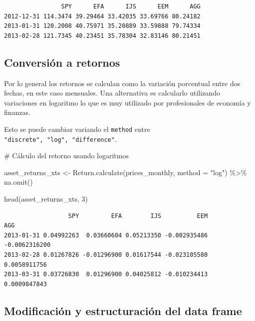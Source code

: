 \documentclass[
  letterpaper,
  DIV=11,
  numbers=noendperiod]{scrartcl}
\newenvironment{Shaded}{\begin{snugshade}}{\end{snugshade}}
\newcommand{\AttributeTok}[1]{\textcolor[rgb]{0.40,0.45,0.13}{#1}}
\newcommand{\CommentTok}[1]{\textcolor[rgb]{0.37,0.37,0.37}{#1}}
\newcommand{\DecValTok}[1]{\textcolor[rgb]{0.68,0.00,0.00}{#1}}
\newcommand{\FunctionTok}[1]{\textcolor[rgb]{0.28,0.35,0.67}{#1}}
\newcommand{\NormalTok}[1]{\textcolor[rgb]{0.00,0.23,0.31}{#1}}
\newcommand{\OtherTok}[1]{\textcolor[rgb]{0.00,0.23,0.31}{#1}}
\newcommand{\SpecialCharTok}[1]{\textcolor[rgb]{0.37,0.37,0.37}{#1}}
\newcommand{\StringTok}[1]{\textcolor[rgb]{0.13,0.47,0.30}{#1}}
\begin{document}
\begin{verbatim}
                SPY      EFA      IJS      EEM      AGG
2012-12-31 114.3474 39.29464 33.42035 33.69766 80.24182
2013-01-31 120.2008 40.75971 35.20889 33.59888 79.74334
2013-02-28 121.7345 40.23451 35.78304 32.83146 80.21451
\end{verbatim}

\subsection{Conversión a retornos}\label{conversiuxf3n-a-retornos}

Por lo general los retornos se calculan como la variación porcentual
entre dos fechas, en este caso mensuales. Una alternativa es calcularlo
utilizando variaciones en logaritmo lo que es muy utilizado por
profesionales de economía y finanzas.

Esto se puede cambiar variando el \texttt{method} entre
\texttt{"discrete",\ "log",\ "difference"}.

\begin{Shaded}
\begin{Highlighting}[]
\CommentTok{\# Cálculo del retorno usando logaritmos}

\NormalTok{asset\_returns\_xts }\OtherTok{\textless{}{-}}
  \FunctionTok{Return.calculate}\NormalTok{(prices\_monthly,}
                   \AttributeTok{method =} \StringTok{"log"}\NormalTok{) }\SpecialCharTok{\%\textgreater{}\%}
  \FunctionTok{na.omit}\NormalTok{()}

\FunctionTok{head}\NormalTok{(asset\_returns\_xts, }\DecValTok{3}\NormalTok{)}
\end{Highlighting}
\end{Shaded}

\begin{verbatim}
                  SPY         EFA        IJS          EEM           AGG
2013-01-31 0.04992263  0.03660604 0.05213350 -0.002935486 -0.0062316200
2013-02-28 0.01267826 -0.01296900 0.01617544 -0.023105580  0.0058911756
2013-03-31 0.03726830  0.01296900 0.04025812 -0.010234413  0.0009847843
\end{verbatim}

\subsection{Modificación y estructuración del data
frame}\label{modificaciuxf3n-y-estructuraciuxf3n-del-data-frame}
\end{document}
